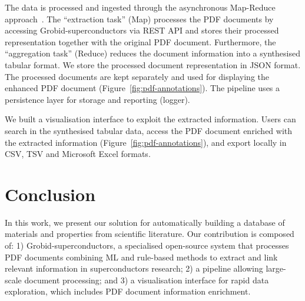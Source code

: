 \documentclass[]{interact}
\theoremstyle{plain}%
\theoremstyle{definition}
\theoremstyle{remark}
\begin{document}
The data is processed and ingested through the asynchronous Map-Reduce approach~\cite{10.1145/1327452.1327492}.
The ``extraction task'' (Map) processes the PDF documents by accessing Grobid-superconductors via REST API and stores their processed representation together with the original PDF document.
Furthermore, the ``aggregation task'' (Reduce) reduces the document information into a synthesised tabular format.
We store the processed document representation in JSON format. 
The processed documents are kept separately and used for displaying the enhanced PDF document (Figure~\ref{fig:pdf-annotations}).
The pipeline uses a persistence layer for storage and reporting (logger).




We built a visualisation interface to exploit the extracted information.
Users can search in the synthesised tabular data, access the PDF document enriched with the extracted information (Figure~\ref{fig:pdf-annotations}), and export locally in CSV, TSV and Microsoft Excel formats.

\section{Conclusion}
\label{sec:conclusion}
In this work, we present our solution for automatically building a database of materials and properties from scientific literature.
Our contribution is composed of: 1) Grobid-superconductors, a specialised open-source system that processes PDF documents combining ML and rule-based methods to extract and link relevant information in superconductors research; 2) a pipeline allowing large-scale document processing; and 3) a visualisation interface for rapid data exploration, which includes PDF document information enrichment.
\end{document}

